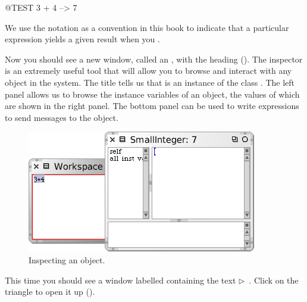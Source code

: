 \documentclass[a4paper,10pt,twoside]{book}
\begin{document}
\begin{code}{@TEST}
3 + 4 --> 7
\end{code}
\noindent
We use the notation \ct{-->} as a convention in this book to indicate that a particular \sq expression yields a given result when you .

\noindent
Now you should see a new window, called an , with the heading  ().
The inspector is an extremely useful tool that will allow you to browse and interact with any object in the system.
The title tells us that  is an instance of the class .
The left panel allows us to browse the instance variables of an object, the values of which are shown in the right panel.
The bottom panel can be used to write expressions to send messages to the object.

\begin{figure}[htb]
\centerline {\includegraphics[scale=0.7]{InspectIt}}
\caption{Inspecting an object. \label{fig:inspectit}}
\end{figure}



This time you should see a window labelled  containing the text
\mbox{$\triangleright$ }.
Click on the triangle to open it up ().
\end{document}
